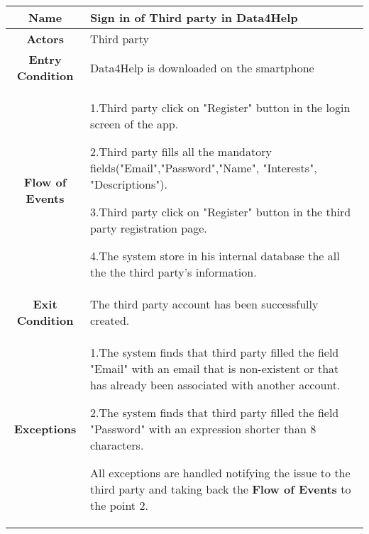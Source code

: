  \begin{table}[h!]
        \centering
        \begin{tabularx}{\linewidth}{|c|X|}
          \hline
          \textbf{Name} & Sign in of Third party in Data4Help\\
        	\hline
        	\textbf{Actors} & Third party \\
        	\hline
        	\textbf{Entry Condition} & Data4Help is downloaded on the smartphone \\
        	\hline
        	\textbf{Flow of Events} & 1.Third party click on "Register" button in the login screen of the app.

        					2.Third party fills all the mandatory fields("Email","Password","Name", "Interests", "Descriptions").

        					3.Third party click on "Register" button in the third party registration page.
					
					4.The system store in his internal database the all the the third party's information.\\

        	\hline
        	\textbf{Exit Condition} & The third party account has been successfully created. \\
        	\hline
        	\textbf{Exceptions} &
 
        					1.The system finds that third party filled the field "Email"  with an email that is non-existent or 						that has already been associated with another account.

        					2.The system finds that third party filled the field "Password" with an expression shorter than 8 							characters.

        					All exceptions are handled notifying the issue to the third party and taking back the \textbf{Flow 					of Events} to the point 2.\\
         
 \hline
       
 \end{tabularx}
     
 \end{table}


